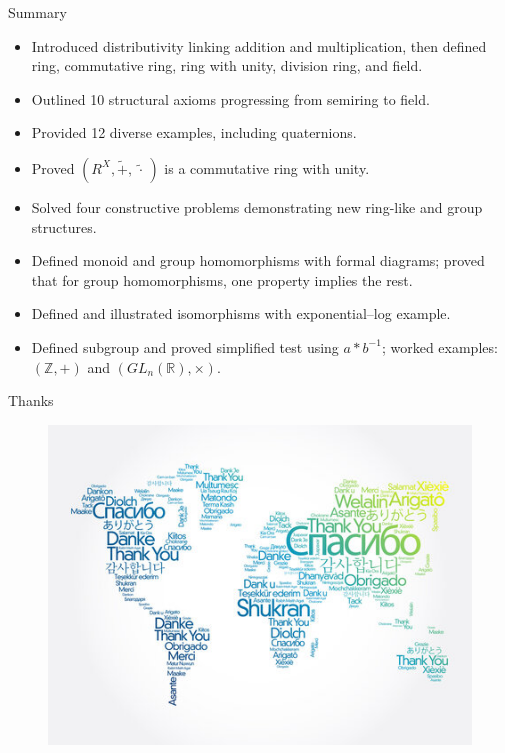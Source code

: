 \documentclass[11pt,aspectratio=43,ignorenonframetext,t]{beamer}
\newcounter{example_number} %
\begin{document}
\begin{frame}{Summary}
\vspace{-0.3cm}
\begin{itemize}
  \item Introduced distributivity linking addition and multiplication, then defined ring, commutative ring, ring with unity, division ring, and field.
\item Outlined 10 structural axioms progressing from semiring to field.
\item Provided 12 diverse examples, including quaternions.
\item Proved $(R^X,\tilde{+},\, \tilde{\cdot}\, )$ is a commutative ring with unity.
\item Solved four constructive problems demonstrating new ring-like and group structures.
\item Defined monoid and group homomorphisms with formal diagrams; proved that for group homomorphisms, one property implies the rest.
\item Defined and illustrated isomorphisms with exponential–log example.
\item Defined subgroup and proved simplified test using \(a*b^{-1}\); worked examples: $(\mathbb{Z},+)$ and $(GL_n(\mathbb{R}),\times)$.
\end{itemize}
\end{frame}

\begin{frame}{Thanks}
    \begin{figure}
        \centering
        \includegraphics[width=0.85\linewidth]{Thanks.png}
    \end{figure}
\end{frame}
\end{document}

